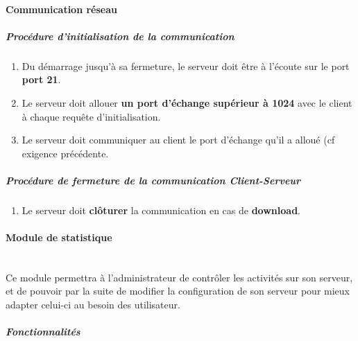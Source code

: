 \documentclass[10pt,a4paper]{report}
\begin{document}
\paragraph{Communication réseau}

	\subparagraph{Procédure d'initialisation de la communication}

		\begin{enumerate}
			\item  Du démarrage jusqu'à sa fermeture, le serveur doit être à l'écoute sur le port \textbf{port 21}.

			\item Le serveur doit allouer \textbf{un port d'échange supérieur à 1024} avec le client à chaque requête d'initialisation.

			\item Le serveur doit communiquer au client le port d'échange qu'il a alloué (cf exigence précédente.

		\end{enumerate}
		
\subparagraph{Procédure de fermeture de la communication Client-Serveur}

	\begin{enumerate}
		\item Le serveur doit \textbf{clôturer} la communication en cas de \textbf{download}. 
	\end{enumerate}
	
\paragraph{Module de statistique \\ \\}

	Ce module permettra à l'administrateur de contrôler les activités sur son serveur, et 	de pouvoir par la suite de modifier la configuration de son serveur pour mieux adapter celui-ci au besoin des utilisateur.

	\subparagraph{Fonctionnalités}
\end{document}
